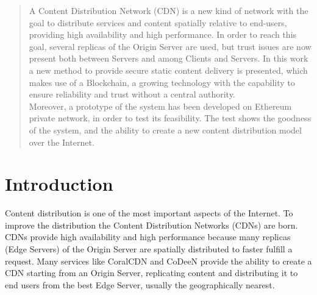 \documentclass[hidelinks,conference,compsoc]{IEEEtran}
\begin{document}
\begin{abstract}
A Content Distribution Network (CDN) is a new kind of network with the goal to distribute services and content spatially relative to end-users, providing high availability and high performance. In order to reach this goal, several replicas of the Origin Server are used, but trust issues are now present both between Servers and among Clients and Servers. In this work a new method to provide secure static content delivery is presented, which makes use of a Blockchain, a growing technology with the capability to ensure reliability and trust without a central authority.\\
Moreover, a prototype of the system has been developed on Ethereum private network, in order to test its feasibility. The test shows the goodness of the system, and the ability to create a new content distribution model over the Internet.  
\end{abstract}





%
\IEEEpeerreviewmaketitle



\section{Introduction}
Content distribution is one of the most important aspects of the Internet. To improve the distribution the Content Distribution Networks (CDNs) are born. CDNs provide high availability and high performance because many replicas (Edge Servers) of the Origin Server are spatially distributed to faster fulfill a request. Many services like CoralCDN\cite{freedman2004democratizing} and CoDeeN\cite{wang2002effectiveness} provide the ability to create a CDN starting from an Origin Server, replicating content and distributing it to end users from the best Edge Server, usually the geographically nearest. %
%
%
\end{document}
